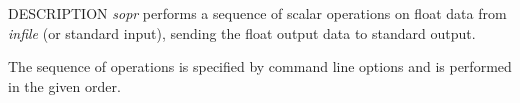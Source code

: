 \begin{synopsis}
\item[sopr] [ --a $A$ ] [ --s $S$ ] [ --m $M$ ] [ --d $D$ ] [--f $F$]
  [--c C] [ --magic $magic$ ]
\item[\ ~~~~~] [ --MAGIC $MAGIC$ ] [ --ABS ] [ --INV ] [ --P ] [ --R ] [ --SQRT ] [ --LN ]
\item[\ ~~~~~] [ --LOG2 ] [ --LOG10 ] [ --LOGX $X$ ] [ --EXP ] [ --POW2 ] [ --POW10 ]
\item[\ ~~~~~] [ --POWX $X$ ] [ --FIX ] [ --UNIT ] [ --CLIP ] [ --SIN ] [ --COS ] [ --TAN ]
\item[\ ~~~~~] [ --ATAN ] [ --r m$n$ ] [ --w m$n$ ] [ {\em infile} ]
\end{synopsis}

\begin{qsection}{DESCRIPTION}
{\em sopr} performs a sequence of scalar operations on float data 
from {\em infile} (or standard input), 
sending the float output data to standard output.

The sequence of operations is specified by command line options
and is performed in the given order.
\end{qsection}

